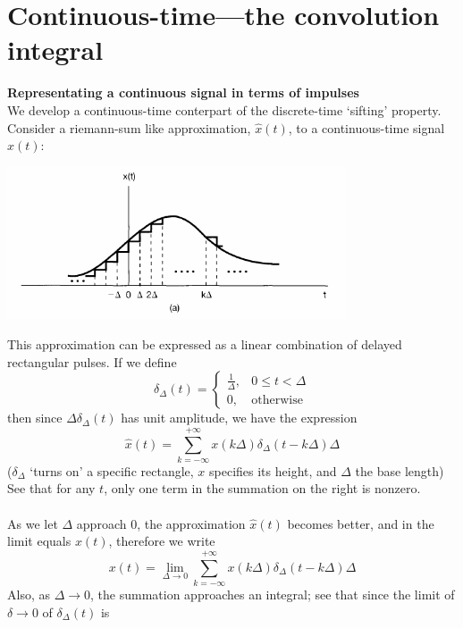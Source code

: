 \documentclass{report}
\begin{document}
\section{Continuous-time---the convolution integral}
\textbf{Representating a continuous signal in terms of impulses}\\
We develop a continuous-time conterpart of the discrete-time `sifting' property. Consider a riemann-sum like approximation, $\hat{x}(t)$, to a continuous-time signal $x(t)$:
\begin{center}
\includegraphics[width=10cm]{a29}\\
\end{center}
This approximation can be expressed as a linear combination of delayed rectangular pulses. If we define
\begin{equation*}
\delta_\Delta(t)=\begin{cases}
\frac{1}{\Delta},&0\leq t<\Delta\\
0,&\text{otherwise}
\end{cases}
\end{equation*}
then since $\Delta\delta_\Delta(t)$ has unit amplitude, we have the expression
\begin{equation*}
\hat{x}(t)=\sum^{+\infty}_{k=-\infty}x(k\Delta)\delta_\Delta(t-k\Delta)\Delta
\end{equation*}
($\delta_\Delta$ `turns on' a specific rectangle, $x$ specifies its height, and $\Delta$ the base length) See that for any $t$,
only one term in the summation on the right is nonzero.\\
\vspace{1mm}\\
As we let $\Delta$ approach 0, the approximation $\hat{x}(t)$ becomes better, and in the limit equals $x(t)$, therefore we write
\begin{equation*}
x(t)=\lim_{\Delta\to0}\sum^{+\infty}_{k=-\infty}x(k\Delta)\delta_\Delta(t-k\Delta)\Delta
\end{equation*}
Also, as $\Delta\to0$, the summation approaches an integral; see that since the limit of $\delta\to0$ of $\delta_\Delta(t)$ is
\end{document}
